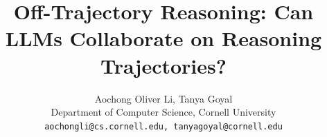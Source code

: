 \documentclass{article} %
\title{Off-Trajectory Reasoning: Can LLMs Collaborate on Reasoning Trajectories?}
\author{Aochong Oliver Li, Tanya Goyal\\
Department of Computer Science, Cornell University\\
\texttt{aochongli@cs.cornell.edu, tanyagoyal@cornell.edu} \\
}
\begin{document}
\maketitle

\begin{abstract}

\end{abstract}
\end{document}
